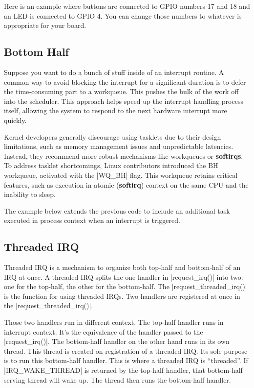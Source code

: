 \documentclass[10pt, oneside]{book}
\begin{document}
Here is an example where buttons are connected to GPIO numbers 17 and 18 and an LED is connected to GPIO 4.
You can change those numbers to whatever is appropriate for your board.


\subsection{Bottom Half}
\label{sec:bottom_half}
Suppose you want to do a bunch of stuff inside of an interrupt routine.
A common way to avoid blocking the interrupt for a significant duration
is to defer the time-consuming part to a workqueue.
This pushes the bulk of the work off into the scheduler.
This approach helps speed up the interrupt handling process itself,
allowing the system to respond to the next hardware interrupt more quickly.

Kernel developers generally discourage using tasklets due to their design limitations,
such as memory management issues and unpredictable latencies.
Instead, they recommend more robust mechanisms like workqueues or \textbf{softirqs}.
To address tasklet shortcomings, Linux contributors introduced the BH workqueue,
activated with the \cpp|WQ_BH| flag.
This workqueue retains critical features,
such as execution in atomic (\textbf{softirq}) context on the same CPU and the inability to sleep.

The example below extends the previous code to include an additional task executed in process context when an interrupt is triggered.

\subsection{Threaded IRQ}
\label{sec:threaded_irq}
Threaded IRQ is a mechanism to organize both top-half and bottom-half of an IRQ at once.
A threaded IRQ splits the one handler in \cpp|request_irq()| into two: one for the top-half, the other for the bottom-half.
The \cpp|request_threaded_irq()| is the function for using threaded IRQs.
Two handlers are registered at once in the \cpp|request_threaded_irq()|.

Those two handlers run in different context.
The top-half handler runs in interrupt context.
It's the equivalence of the handler passed to the \cpp|request_irq()|.
The bottom-half handler on the other hand runs in its own thread.
This thread is created on registration of a threaded IRQ.
Its sole purpose is to run this bottom-half handler.
This is where a threaded IRQ is ``threaded''.
If \cpp|IRQ_WAKE_THREAD| is returned by the top-half handler, that bottom-half serving thread will wake up.
The thread then runs the bottom-half handler.
\end{document}
